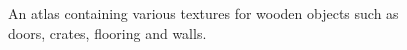 \documentclass[12pt]{article}
\begin{document}
\begin{figure}[!htbp]
\begin{center}
\caption{An atlas containing various textures for wooden objects such as doors, crates, flooring and walls.}
\end{center}
\end{figure}
\end{document}
